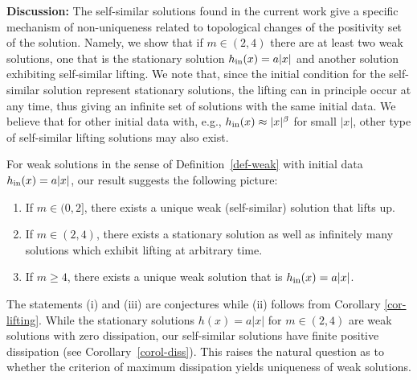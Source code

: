 \documentclass{article}%
\begin{document}
\medskip


\textbf{Discussion:} The self-similar solutions found in the current work give a
specific mechanism of non-uniqueness related to topological changes of the
positivity set of the solution. Namely, we show that if $m\in (2,4)$ there are
at least two weak solutions, one that is the stationary solution
$h_{\rm in}(x)=a|x|$ and another solution exhibiting self-similar lifting. We note that, since the initial
condition for the self-similar solution represent stationary solutions, the
  lifting can in principle occur at any time, thus giving an infinite set of
solutions with the same initial data.  We believe that for other initial data
with, e.g., $h_{\rm in}(x) \approx |x|^{\beta}$ for small $|x|$, other type of 
self-similar lifting solutions may also exist.

  \medskip

  For weak solutions in the sense of Definition~\ref{def-weak} with initial data 
$h_{\rm in}(x)=a|x|$, our result suggests the following picture:
  \begin{enumerate}
  \item If $m \in (0,2]$, there exists a unique weak (self-similar) solution that lifts up.
  \item If $m \in (2,4)$, there exists a stationary solution as well as infinitely many 
solutions which exhibit lifting at arbitrary time.
  \item If $m \geq  4$, there exists a unique weak solution that is $h_{\rm in}(x)=a|x|$.
  \end{enumerate}
  The statements (i) and (iii) are conjectures while (ii) follows from Corollary \ref{cor-lifting}.  
While the stationary solutions $h(x)=a|x|$ for $m \in (2,4)$ are weak solutions with zero dissipation, 
our self-similar solutions have finite positive dissipation (see Corollary~\ref{corol-diss}). 
This raises the natural question as to whether the criterion of maximum dissipation yields uniqueness 
of weak solutions.
\end{document}
